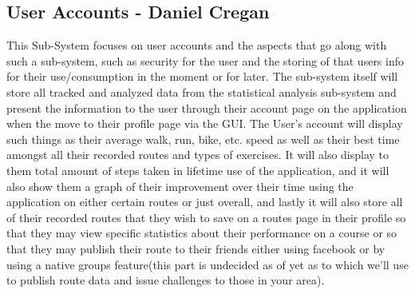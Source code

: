 \documentclass{article}
\begin{document}

\newpage

\subsection{User Accounts - Daniel Cregan}
This Sub-System focuses on user accounts and the aspects that go along with such a sub-system, such as security for the user and the storing of that users info for their use/consumption in the moment or for later.
The sub-system itself will store all tracked and analyzed data from the statistical analysis sub-system and present the information to the user through their account page on the application when the move to their profile page via the GUI. The User's account will display such things as their average walk, run, bike, etc. speed as well as their best time amongst all their recorded routes and types of exercises. It will also display to them total amount of steps taken in lifetime use of the application, and it will also show them a graph of their improvement over their time using the application on either certain routes or just overall, and lastly it will also store all of their recorded routes that they wish to save on a routes page in their profile so that they may view specific statistics about their performance on a course or so that they may publish their route to their friends either using facebook or by using a native groups feature(this part is undecided as of yet as to which we’ll use to publish route data and issue challenges to those in your area).
\end{document}
